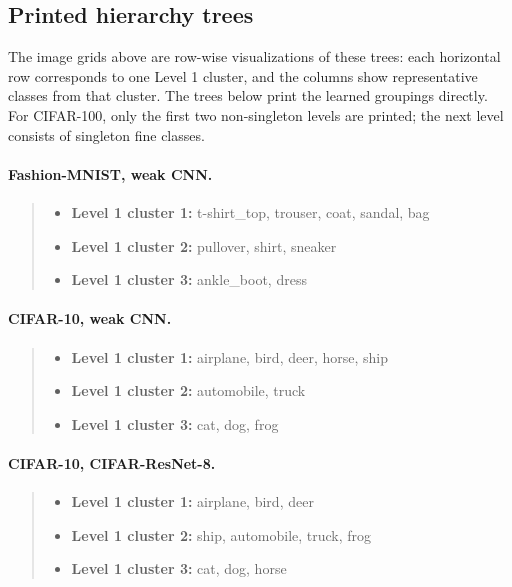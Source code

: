 \subsection{Printed hierarchy trees}

The image grids above are row-wise visualizations of these trees: each horizontal row corresponds to one Level 1 cluster, and the columns show representative classes from that cluster. The trees below print the learned groupings directly. For CIFAR-100, only the first two non-singleton levels are printed; the next level consists of singleton fine classes.

\paragraph{Fashion-MNIST, weak CNN.}
\begin{quote}
\footnotesize
\raggedright
\begin{itemize}
\setlength{\itemsep}{0.2em}
\item \textbf{Level 1 cluster 1:} t-shirt\_top, trouser, coat, sandal, bag
\item \textbf{Level 1 cluster 2:} pullover, shirt, sneaker
\item \textbf{Level 1 cluster 3:} ankle\_boot, dress
\end{itemize}
\end{quote}

\paragraph{CIFAR-10, weak CNN.}
\begin{quote}
\footnotesize
\raggedright
\begin{itemize}
\setlength{\itemsep}{0.2em}
\item \textbf{Level 1 cluster 1:} airplane, bird, deer, horse, ship
\item \textbf{Level 1 cluster 2:} automobile, truck
\item \textbf{Level 1 cluster 3:} cat, dog, frog
\end{itemize}
\end{quote}

\paragraph{CIFAR-10, CIFAR-ResNet-8.}
\begin{quote}
\footnotesize
\raggedright
\begin{itemize}
\setlength{\itemsep}{0.2em}
\item \textbf{Level 1 cluster 1:} airplane, bird, deer
\item \textbf{Level 1 cluster 2:} ship, automobile, truck, frog
\item \textbf{Level 1 cluster 3:} cat, dog, horse
\end{itemize}
\end{quote}

